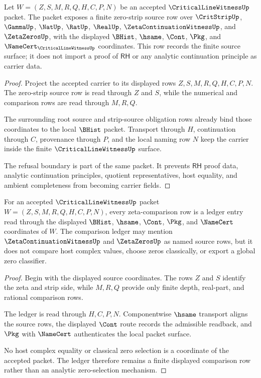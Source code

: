 \begin{theorem}
\label{thm:critical-line-witness-zero-strip-carrier}
Let $W=(Z,S,M,R,Q,H,C,P,N)$ be an accepted $\CriticalLineWitnessUp$ packet. The packet exposes a finite zero-strip source row over $\CritStripUp$, $\GammaUp$, $\NatUp$, $\RatUp$, $\RealUp$, $\ZetaContinuationWitnessUp$, and $\ZetaZerosUp$, with the displayed $\BHist$, $\hsame$, $\Cont$, $\Pkg$, and $\NameCert_{\CriticalLineWitnessUp}$ coordinates. This row records the finite source surface; it does not import a proof of $\mathsf{RH}$ or any analytic continuation principle as carrier data.
\end{theorem}
\begin{proof}
Project the accepted carrier to its displayed rows $Z,S,M,R,Q,H,C,P,N$. The zero-strip source row is read through $Z$ and $S$, while the numerical and comparison rows are read through $M,R,Q$.

The surrounding root source and strip-source obligation rows already bind those coordinates to the local $\BHist$ packet. Transport through $H$, continuation through $C$, provenance through $P$, and the local naming row $N$ keep the carrier inside the finite $\CriticalLineWitnessUp$ surface.

The refusal boundary is part of the same packet. It prevents $\mathsf{RH}$ proof data, analytic continuation principles, quotient representatives, host equality, and ambient completeness from becoming carrier fields.
\end{proof}

\begin{theorem}
\label{thm:critical-line-witness-zeta-comparison-ledger}
For an accepted $\CriticalLineWitnessUp$ packet $W=(Z,S,M,R,Q,H,C,P,N)$, every zeta-comparison row is a ledger entry read through the displayed $\BHist$, $\hsame$, $\Cont$, $\Pkg$, and $\NameCert$ coordinates of $W$. The comparison ledger may mention $\ZetaContinuationWitnessUp$ and $\ZetaZerosUp$ as named source rows, but it does not compare host complex values, choose zeros classically, or export a global zero classifier.
\end{theorem}
\begin{proof}
Begin with the displayed source coordinates. The rows $Z$ and $S$ identify the zeta and strip side, while $M,R,Q$ provide only finite depth, real-part, and rational comparison rows.

The ledger is read through $H,C,P,N$. Componentwise $\hsame$ transport aligns the source rows, the displayed $\Cont$ route records the admissible readback, and $\Pkg$ with $\NameCert$ authenticates the local packet surface.

No host complex equality or classical zero selection is a coordinate of the accepted packet. The ledger therefore remains a finite displayed comparison row rather than an analytic zero-selection mechanism.
\end{proof}

